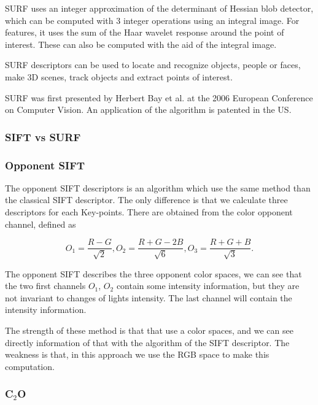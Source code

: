 \documentclass[12pt]{article}
\begin{document}
SURF uses an integer approximation of the determinant of Hessian blob detector, which can be computed with 3 integer operations using an integral image. For features, it uses the sum of the Haar wavelet response around the point of interest. These can also be computed with the aid of the integral image.

SURF descriptors can be used to locate and recognize objects, people or faces, make 3D scenes, track objects and extract points of interest.

SURF was first presented by Herbert Bay et al. at the 2006 European Conference on Computer Vision. An application of the algorithm is patented in the US.
\subsubsection{SIFT vs SURF}

\subsubsection{Opponent SIFT}

The opponent SIFT descriptors is an algorithm which use the same method than the classical SIFT descriptor. The only difference is that we calculate three descriptors for each Key-points. There are obtained from the color opponent channel, defined as

\begin{equation}
O_{1} = \frac{R - G}{\sqrt{2}}, O_{2} = \frac{R + G - 2B}{\sqrt{6}}, O_{3} = \frac{R + G + B}{\sqrt{3}}. 
\end{equation}

The opponent SIFT describes the three opponent color spaces, we can see that the two first channels $O_1$, $O_2$ contain some intensity information, but they are not invariant to changes of lights intensity. The last channel will contain the intensity information. 

The strength of these method is that that use a color spaces, and we can see directly information of that with the algorithm of the SIFT descriptor. The weakness is that, in this approach we use the RGB space to make this computation.   

\subsubsection{C$_2$O}

\end{document}

